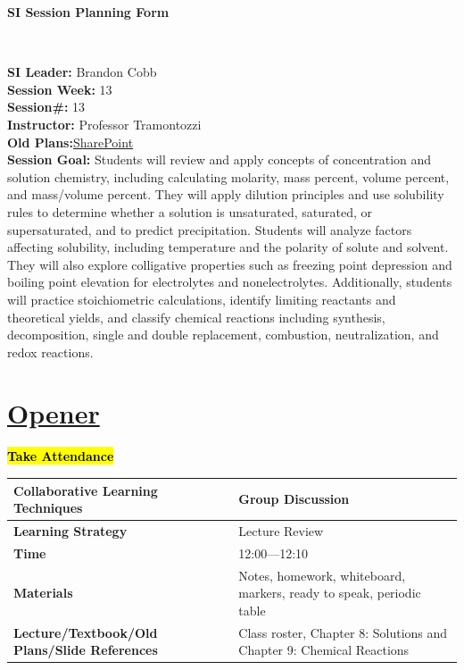 \documentclass{article}
\begin{document}
\begin{center}
    {\LARGE\textbf{SI Session Planning Form}}
\end{center}

\
\noindent
\begin{flushleft}
\textbf{SI Leader:} Brandon Cobb\\
\textbf{Session Week:} 13\\
\textbf{Session\#:} 13\\
\textbf{Instructor:} Professor Tramontozzi\\
\textbf{Old Plans:}\href{https://macombedu.sharepoint.com/:b:/s/ASC-SupplementalInstructionEmbeddedTutoring/EeSYqCwT_KhMolgJvXbVEjgBOyF_DevvS8BgCm1zPkQQJg?e=QJTt4o}{SharePoint}\\
\textbf{Session Goal:} Students will review and apply concepts of concentration and solution chemistry, including calculating molarity, mass percent, volume percent, and mass/volume percent. They will apply dilution principles and use solubility rules to determine whether a solution is unsaturated, saturated, or supersaturated, and to predict precipitation. Students will analyze factors affecting solubility, including temperature and the polarity of solute and solvent. They will also explore colligative properties such as freezing point depression and boiling point elevation for electrolytes and nonelectrolytes. Additionally, students will practice stoichiometric calculations, identify limiting reactants and theoretical yields, and classify chemical reactions including synthesis, decomposition, single and double replacement, combustion, neutralization, and redox reactions.

\end{flushleft}

\vspace{1em}
\section*{\underline{Opener}}
{\centering\large\textbf{\hl{Take Attendance}}\par}\vspace{-0.25\baselineskip}
\noindent
\begin{tabular}{|p{4.2cm}|p{9.8cm}|}
\hline
\textbf{Collaborative Learning Techniques} & Group Discussion\\
\hline
\textbf{Learning Strategy} & Lecture Review\\
\hline
\textbf{Time} & 12:00---12:10\\
\hline
\textbf{Materials} & Notes, homework, whiteboard, markers, ready to speak, periodic table \\
\hline
\textbf{Lecture/Textbook/Old Plans/Slide References} & Class roster, Chapter 
8: Solutions and Chapter 9: Chemical Reactions\\
\hline
\end{tabular}
\end{document}
